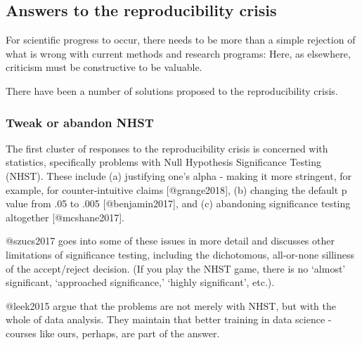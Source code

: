 \documentclass[
]{article}
\begin{document}
\hypertarget{answers-to-the-reproducibility-crisis}{%
\subsection{Answers to the reproducibility
crisis}\label{answers-to-the-reproducibility-crisis}}

For scientific progress to occur, there needs to be more than a simple
rejection of what is wrong with current methods and research programs:
Here, as elsewhere, criticism must be constructive to be valuable.

There have been a number of solutions proposed to the reproducibility
crisis.

\hypertarget{tweak-or-abandon-nhst}{%
\subsubsection{Tweak or abandon NHST}\label{tweak-or-abandon-nhst}}

The first cluster of responses to the reproducibility crisis is
concerned with statistics, specifically problems with Null Hypothesis
Significance Testing (NHST). These include (a) justifying one's alpha -
making it more stringent, for example, for counter-intuitive claims
{[}@grange2018{]}, (b) changing the default p value from .05 to .005
{[}@benjamin2017{]}, and (c) abandoning significance testing altogether
{[}@mcshane2017{]}.

@szucs2017 goes into some of these issues in more detail and discusses
other limitations of significance testing, including the dichotomous,
all-or-none silliness of the accept/reject decision. (If you play the
NHST game, there is no `almost' significant, `approached significance,'
`highly significant', etc.).

@leek2015 argue that the problems are not merely with NHST, but with the
whole of data analysis. They maintain that better training in data
science - courses like ours, perhaps, are part of the answer.
\end{document}

